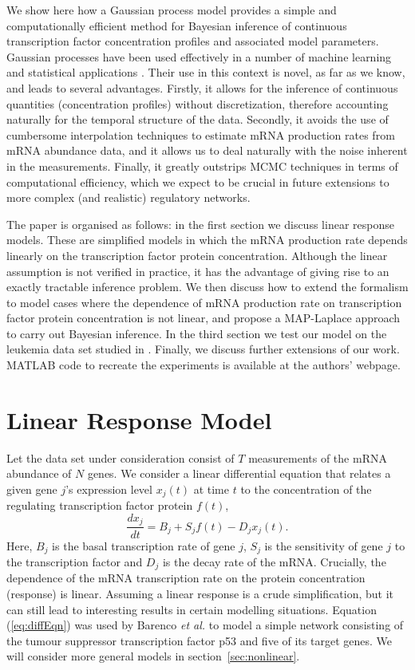 \documentclass[english]{article}
\begin{document}
We show
here how a Gaussian process model provides a simple and computationally 
efficient method for Bayesian inference of
continuous transcription factor concentration profiles and associated
model parameters. Gaussian processes have been used effectively in a number
of machine learning and statistical applications \cite{Rasmussen:book05}. 
Their use in this context is novel, as far as we know, and leads to several 
advantages. Firstly, it allows
for the inference of continuous quantities (concentration profiles)
without discretization, therefore accounting naturally for the temporal 
structure of the data. Secondly, it avoids the use of cumbersome interpolation
techniques to estimate mRNA production rates from mRNA abundance data, and it
allows us to deal naturally with the noise inherent 
in the measurements. Finally,
it greatly outstrips MCMC techniques in terms of computational efficiency, 
which we expect to be crucial in future extensions to more complex (and
realistic) regulatory networks.

The paper is organised as follows: in the first section we discuss linear 
response models. These are simplified models in which the mRNA production
rate depends linearly on the transcription factor protein concentration. 
Although the linear assumption is not verified in practice, it has the 
advantage of giving rise to an exactly tractable inference problem. We then
discuss how to extend the formalism to model cases where the dependence of
mRNA production rate on transcription factor protein concentration is not 
linear, and propose a MAP-Laplace approach to carry out Bayesian inference. 
In the third section we test our model on the leukemia data set studied in
\cite{Barenco:ranked06}. Finally, we discuss further extensions of our
work. 
MATLAB code to recreate the experiments is available at the authors' webpage.
\section{Linear Response Model}

Let the data set under consideration consist of $T$ measurements of the mRNA 
abundance of $N$ genes. We consider a linear differential
equation that relates a given gene $j$'s expression level $x_{j}(t)$
at time $t$ to the concentration
of the regulating transcription factor protein $f(t)$,\begin{equation}
\frac{dx_{j}}{dt}=B_{j}+S_{j}f\left(t\right)-D_{j}x_{j}\left(t\right)
. \label{eq:diffEqn}\end{equation}
Here, $B_{j}$ is the basal transcription rate of gene $j$, $S_{j}$ is the sensitivity of gene $j$ to the transcription
factor and $D_{j}$ is the decay rate of the mRNA. Crucially, the dependence of
the mRNA transcription rate on the protein concentration (response) is linear. 
Assuming a linear response is a 
crude simplification, but it can still lead to interesting results 
in certain modelling 
situations. Equation (\ref{eq:diffEqn}) was used by Barenco \emph{et al.}
\cite{Barenco:ranked06}
to model a simple network consisting of the tumour suppressor transcription
factor p53 and five of its target genes. 
We will consider more general models in section~\ref{sec:nonlinear}.
\end{document}
